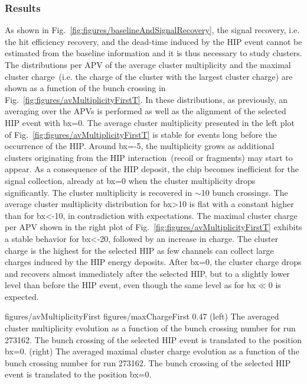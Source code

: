 \subsubsection{Results}

As shown in Fig.~\ref{fig:figures/baselineAndSignalRecovery}, the signal recovery, i.e. the hit efficiency recovery, and the dead-time induced by the HIP event cannot be estimated from the baseline information and it is thus necessary to study clusters. The distributions per APV of the average cluster multiplicity and the maximal cluster charge~(i.e. the charge of the cluster with the largest cluster charge)  are shown as a function of the bunch crossing in Fig.~\ref{fig:figures/avMultiplicityFirstT}. In these distributions, as previously, an averaging over the APVs is performed as well as the alignment of the selected HIP event with bx=0. The average cluster multiplicity presented in the left plot of Fig.~\ref{fig:figures/avMultiplicityFirstT} is stable for events long before the occurrence of the HIP. Around bx=-5, the multiplicity grows as additional clusters originating from the HIP interaction~(recoil or fragments) may start to appear. As a consequence of the HIP deposit, the chip becomes inefficient for the signal collection, already at bx=0 when  the cluster multiplicity drops significantly. The cluster multiplicity is recovered in $\sim$10 bunch crossings. The average cluster multiplicity distribution for bx>10 is flat with a constant higher than for bx<-10, in contradiction with expectations. The maximal cluster charge per APV shown in the right plot of Fig.~\ref{fig:figures/avMultiplicityFirstT} exhibits a stable behavior for bx<-20, followed by an increase in charge. The cluster charge is the highest for the selected HIP as few channels can collect large charges induced by the HIP energy deposits. After bx=0, the cluster charge drops and recovers almost immediately after the selected HIP, but to a slightly lower level than before the HIP event, even though the same level as for bx$\ll$0 is expected. 

                 {figures/avMultiplicityFirst} %
                 {figures/maxChargeFirst} %
                 {0.47}       %
                 {(left) The averaged cluster multiplicity evolution as a function of the bunch crossing number for run 273162. The bunch crossing of the selected HIP event is translated to the position bx=0. (right) The averaged maximal cluster charge evolution as a function of the bunch crossing number for run 273162. The bunch crossing of the selected HIP event is translated to the position bx=0. } %

